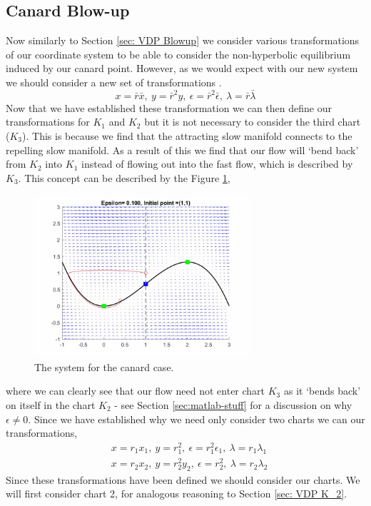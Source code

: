 \subsection{Canard Blow-up}
Now similarly to Section \ref{sec: VDP Blowup} we consider various transformations of our coordinate system to be able to consider the non-hyperbolic equilibrium induced by our canard point. However, as we would expect with our new system we should consider a new set of transformations \citep{krupa2001}.
\begin{equation}
x=\bar{r}\bar{x}, \ y=\bar{r}^2y, \ \epsilon=\bar{r}^2\bar{\epsilon}, \ \lambda=\bar{r}\bar{\lambda}
\end{equation}
Now that we have established these transformation we can then define our transformations for $K_1$ and $K_2$ but it is not necessary to consider the third chart ($K_3$). This is because we find that the attracting slow manifold connects to the repelling slow manifold. As a result of this we find that our flow will `bend back' from $K_2$ into $K_1$ instead of flowing out into the fast flow, which is described by $K_3$. This concept can be described by the Figure \ref{fig: flow in canard},
\begin{figure}[h!]
	\centering
\includegraphics[width=8cm, height=6cm]{Images/vdPhopf-Moment-bendback}
	\caption{The \vdp system for the canard case.}
	\label{fig: flow in canard}
\end{figure}\newpage
where we can clearly see that our flow need not enter chart $ K_3 $ as it `bends back' on itself in the chart $ K_2 $ - see Section \ref{sec:matlab-stuff} for a discussion on why $ \epsilon\neq0 $. Since we have established why we need only consider two charts we can our transformations,
\begin{subequations}
	\begin{align}
	&x=r_1x_1, \ y=r_1^2, \ \epsilon=r_1^2\epsilon_1, \ \lambda=r_1\lambda_1 \label{eq: coordiante K1}\\ 
	&x=r_2x_2, \ y=r_2^2y_2, \ \epsilon=r^2_2, \ \lambda=r_2\lambda_2 \label{eq: coordinate K2}
	\end{align}
\end{subequations}
Since these transformations have been defined we should consider our charts. We will first consider chart 2, for analogous reasoning to Section \ref{sec: VDP K_2}. 


